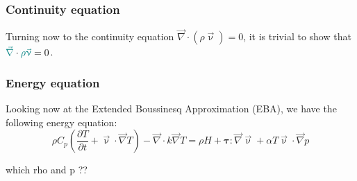 \documentclass[a4paper,11pt]{article}
\begin{document}
\subsubsection{Continuity equation} 

Turning now to the continuity equation $\vec\nabla \cdot (\rho \vec\upnu) = 0$,
it is trivial to show that  
${\color{teal} \vec\nabla } \cdot  {\color{teal} \rho \vec\upnu} = 0$.

\subsubsection{Energy equation} 

Looking now at the Extended Boussinesq Approximation (EBA), we have the following energy equation:
\[
\rho C_p \left(\frac{\partial T}{\partial t} + \vec \upnu\cdot\vec\nabla T\right)
- \vec\nabla\cdot k\vec\nabla T 
= \rho H + {\bm \tau} : \vec\nabla \vec\upnu
+\alpha T  \vec\upnu \cdot \vec\nabla p 
\]

{\color{red} which rho and p ??}
\end{document}
